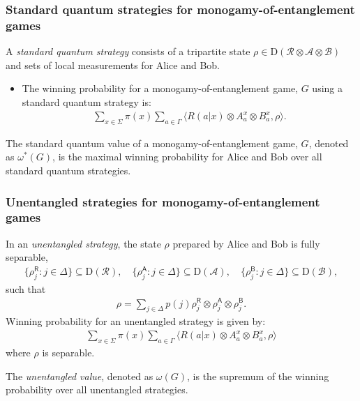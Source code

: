 \documentclass{beamer}
\newcommand{\tinyspace}{\mspace{1mu}}
\newcommand{\biggip}[2]{\biggl\langle #1, #2 \biggr\rangle}
\newcommand{\biggnorm}[1]{\biggl\lVert\tinyspace #1 \tinyspace\biggr\rVert}
\def\A{\mathcal{A}}
\def\B{\mathcal{B}}
\def\R{\mathcal{R}}
\newcommand{\setft}[1]{\mathrm{#1}}
\newcommand{\Density}{\setft{D}}
\newcommand{\reg}[1]{\mathsf{#1}}
\begin{document}
\begin{frame}
	\frametitle{Standard quantum strategies for monogamy-of-entanglement games}
	A \emph{standard quantum strategy} consists of a tripartite state $\rho \in \Density(\R \otimes \A \otimes \B)$ and sets of local measurements for Alice and Bob. 
	\begin{itemize}
		\item The winning probability for a monogamy-of-entanglement game, $G$ using a standard quantum strategy is:
			\begin{align*}
				\sum_{x \in \Sigma} \pi(x) \sum_{a \in \Gamma} \biggip{R(a|x) \otimes A_a^x \otimes B_a^x}{\rho}.
			\end{align*}
	\end{itemize}
The standard quantum value of a monogamy-of-entanglement game, $G$, denoted as $\omega^*(G)$, is the maximal winning probability for Alice and Bob over all standard quantum strategies. 	
\end{frame}

\begin{frame}
	\frametitle{Unentangled strategies for monogamy-of-entanglement games}
	In an \emph{unentangled strategy}, the state $\rho$ prepared by Alice and Bob is fully separable, 
	\begin{align*}
		\{ \rho_j^{\reg{R}} : j \in \Delta \} \subseteq \Density(\R), \quad \{ \rho_j^{\reg{A}} : j \in \Delta \} \subseteq \Density(\A), \quad \{ \rho_j^{\reg{B}} : j \in \Delta \} \subseteq \Density(\B),
	\end{align*}
	such that 
	\begin{align*}
		\rho = \sum_{j \in \Delta} p(j) \rho_j^{\reg{R}} \otimes \rho_j^{\reg{A}} \otimes \rho_j^{\reg{B}}.
	\end{align*}
	\vspace{5mm}
	\pause
	Winning probability for an unentangled strategy is given by:
	\begin{align*}
		\sum_{x \in \Sigma} \pi(x) \sum_{a \in \Gamma} \biggip{R(a|x) \otimes A_a^x \otimes B_a^x}{\rho}
	\end{align*}
where $\rho$ is separable. 

	The \emph{unentangled value}, denoted as $\omega(G)$, is the supremum of the winning probability over all unentangled strategies.	
\end{frame}
\end{document}
